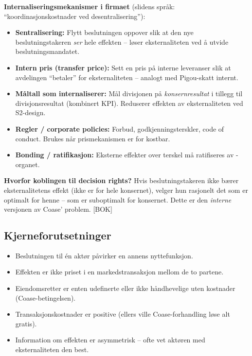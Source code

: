 \textbf{Internaliseringsmekanismer i firmaet} (slidens språk: ``koordinasjonskostnader ved desentralisering''):
\begin{itemize}
\item \textbf{Sentralisering:} Flytt beslutningen oppover slik at den nye beslutningstakeren \emph{ser} hele effekten -- løser eksternaliteten ved å utvide beslutningsmandatet.
\item \textbf{Intern pris (transfer price):} Sett en pris på interne leveranser slik at avdelingen ``betaler'' for eksternaliteten -- analogt med Pigou-skatt internt.
\item \textbf{Måltall som internaliserer:} Mål divisjonen på \emph{konsernresultat} i tillegg til divisjonsresultat (kombinert KPI). Reduserer effekten av eksternaliteten ved S2-design.
\item \textbf{Regler / corporate policies:} Forbud, godkjenningsterskler, code of conduct. Brukes når prismekanismen er for kostbar.
\item \textbf{Bonding / ratifikasjon:} Eksterne effekter over terskel må ratifiseres av -organet.
\end{itemize}

\textbf{Hvorfor koblingen til decision rights?} Hvis beslutningstakeren ikke bærer eksternalitetens effekt (ikke er  for hele konsernet), velger hun rasjonelt det som er optimalt for henne -- som er suboptimalt for konsernet. Dette er den \emph{interne} versjonen av Coase' problem. [BOK]

\subsection*{Kjerneforutsetninger}
\begin{itemize}
\item Beslutningen til én aktør påvirker en annens nyttefunksjon.
\item Effekten er ikke priset i en markedstransaksjon mellom de to partene.
\item Eiendomsretter er enten udefinerte eller ikke håndhevelige uten kostnader (Coase-betingelsen).
\item Transaksjonskostnader er positive (ellers ville Coase-forhandling løse alt gratis).
\item Information om effekten er asymmetrisk -- ofte vet aktøren med eksternaliteten den best.
\end{itemize}

